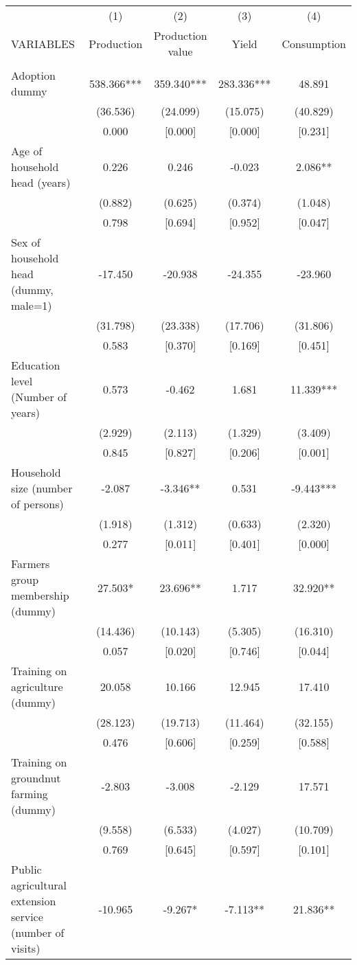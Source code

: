 \documentclass[]{article}
\begin{document}
\begin{tabular}{lcccc} \hline
 & (1) & (2) & (3) & (4) \\
VARIABLES & Production & Production value & Yield & Consumption \\ \hline
 &  &  &  &  \\
Adoption dummy & 538.366*** & 359.340*** & 283.336*** & 48.891 \\
 & (36.536) & (24.099) & (15.075) & (40.829) \\
 & 0.000 & [0.000] & [0.000] & [0.231] \\
Age of household head (years) & 0.226 & 0.246 & -0.023 & 2.086** \\
 & (0.882) & (0.625) & (0.374) & (1.048) \\
 & 0.798 & [0.694] & [0.952] & [0.047] \\
Sex of household head (dummy, male=1) & -17.450 & -20.938 & -24.355 & -23.960 \\
 & (31.798) & (23.338) & (17.706) & (31.806) \\
 & 0.583 & [0.370] & [0.169] & [0.451] \\
Education level (Number of years) & 0.573 & -0.462 & 1.681 & 11.339*** \\
 & (2.929) & (2.113) & (1.329) & (3.409) \\
 & 0.845 & [0.827] & [0.206] & [0.001] \\
Household size (number of persons) & -2.087 & -3.346** & 0.531 & -9.443*** \\
 & (1.918) & (1.312) & (0.633) & (2.320) \\
 & 0.277 & [0.011] & [0.401] & [0.000] \\
Farmers group membership (dummy) & 27.503* & 23.696** & 1.717 & 32.920** \\
 & (14.436) & (10.143) & (5.305) & (16.310) \\
 & 0.057 & [0.020] & [0.746] & [0.044] \\
Training on agriculture (dummy) & 20.058 & 10.166 & 12.945 & 17.410 \\
 & (28.123) & (19.713) & (11.464) & (32.155) \\
 & 0.476 & [0.606] & [0.259] & [0.588] \\
Training on groundnut farming (dummy) & -2.803 & -3.008 & -2.129 & 17.571 \\
 & (9.558) & (6.533) & (4.027) & (10.709) \\
 & 0.769 & [0.645] & [0.597] & [0.101] \\
Public agricultural extension service (number of visits) & -10.965 & -9.267* & -7.113** & 21.836** \\

\end{tabular}
\end{document}
